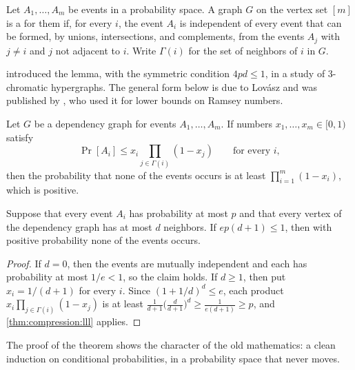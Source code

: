 \begin{refsection}
Let $A_1,\dots,A_m$ be events in a probability space. A graph $G$ on the vertex set $[m]$ is a  for them if, for every $i$, the event $A_i$ is independent of every event that can be formed, by unions, intersections, and complements, from the events $A_j$ with $j\ne i$ and $j$ not adjacent to $i$. Write $\Gamma(i)$ for the set of neighbors of $i$ in $G$.

\textcite{ErdosLovasz1975} introduced the lemma, with the symmetric condition $4pd\le1$, in a study of 3-chromatic hypergraphs. The general form below is due to Lov\'asz and was published by \textcite{Spencer1977}, who used it for lower bounds on Ramsey numbers.

\begin{theorem}\label{thm:compression:lll}
Let $G$ be a dependency graph for events $A_1,\dots,A_m$. If numbers $x_1,\dots,x_m\in[0,1)$ satisfy
\begin{equation}\label{eq:compression:lll}
\Pr[A_i]\le x_i\prod_{j\in\Gamma(i)}(1-x_j)\qquad\text{for every } i,
\end{equation}
then the probability that none of the events occurs is at least $\prod_{i=1}^m(1-x_i)$, which is positive.
\end{theorem}

\begin{corollary}\label{cor:compression:symmetric}
Suppose that every event $A_i$ has probability at most $p$ and that every vertex of the dependency graph has at most $d$ neighbors. If $ep(d+1)\le1$, then with positive probability none of the events occurs.
\end{corollary}

\begin{proof}
If $d=0$, then the events are mutually independent and each has probability at most $1/e<1$, so the claim holds. If $d\ge1$, then put $x_i=1/(d+1)$ for every $i$. Since $(1+1/d)^d\le e$, each product $x_i\prod_{j\in\Gamma(i)}(1-x_j)$ is at least $\frac{1}{d+1}\bigl(\frac{d}{d+1}\bigr)^d\ge\frac{1}{e(d+1)}\ge p$, and \cref{thm:compression:lll} applies.
\end{proof}

The proof of the theorem shows the character of the old mathematics: a clean induction on conditional probabilities, in a probability space that never moves.


\end{refsection}

